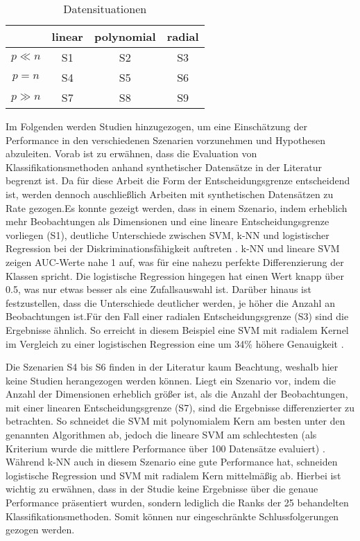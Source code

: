 \documentclass[
]{article}
\begin{document}
\begin{table}[h]
\begin{center}
\begin{tabular}{ |c|c|c|c| }
 \hline
  & linear & polynomial & radial \\
 \hline
 $p \ll n$ & S1 & S2 & S3 \\
 \hline
 $p = n$ & S4 & S5 & S6 \\
 \hline
 $p \gg n$ & S7 & S8 & S9 \\
 \hline
\end{tabular}
\end{center}
\caption{Datensituationen}
\label{tab:datensituationen}
\end{table}

Im Folgenden werden Studien hinzugezogen, um eine Einschätzung der
Performance in den verschiedenen Szenarien vorzunehmen und Hypothesen
abzuleiten. Vorab ist zu erwähnen, dass die Evaluation von
Klassifikationsmethoden anhand synthetischer Datensätze in der Literatur
begrenzt ist. Da für diese Arbeit die Form der Entscheidungsgrenze
entscheidend ist, werden dennoch auschließlich Arbeiten mit
synthetischen Datensätzen zu Rate gezogen.\newline Es konnte gezeigt
werden, dass in einem Szenario, indem erheblich mehr Beobachtungen als
Dimensionen und eine lineare Entscheidungsgrenze vorliegen (S1),
deutliche Unterschiede zwischen SVM, k-NN und logistischer Regression
bei der Diskriminationsfähigkeit auftreten
\parencite{entezari-malekiComparisonClassificationMethods2009}. k-NN und
lineare SVM zeigen AUC-Werte nahe 1 auf, was für eine nahezu perfekte
Differenzierung der Klassen spricht. Die logistische Regression hingegen
hat einen Wert knapp über 0.5, was nur etwas besser als eine
Zufallsauswahl ist. Darüber hinaus ist festzustellen, dass die
Unterschiede deutlicher werden, je höher die Anzahl an Beobachtungen
ist.\newline Für den Fall einer radialen Entscheidungsgrenze (S3) sind
die Ergebnisse ähnlich. So erreicht in diesem Beispiel eine SVM mit
radialem Kernel im Vergleich zu einer logistischen Regression eine um
34\% höhere Genauigkeit
\parencite{faveroClassificationPerformanceEvaluation2022}.

Die Szenarien S4 bis S6 finden in der Literatur kaum Beachtung, weshalb
hier keine Studien herangezogen werden können. Liegt ein Szenario vor,
indem die Anzahl der Dimensionen erheblich größer ist, als die Anzahl
der Beobachtungen, mit einer linearen Entscheidungsgrenze (S7), sind die
Ergebnisse differenzierter zu betrachten. So schneidet die SVM mit
polynomialem Kern am besten unter den genannten Algorithmen ab, jedoch
die lineare SVM am schlechtesten (als Kriterium wurde die mittlere
Performance über 100 Datensätze evaluiert)
\parencite{scholzComparisonClassificationMethods2021}. Während k-NN auch
in diesem Szenario eine gute Performance hat, schneiden logistische
Regression und SVM mit radialem Kern mittelmäßig ab. Hierbei ist wichtig
zu erwähnen, dass in der Studie keine Ergebnisse über die genaue
Performance präsentiert wurden, sondern lediglich die Ranks der 25
behandelten Klassifikationsmethoden. Somit können nur eingeschränkte
Schlussfolgerungen gezogen werden.
\end{document}
